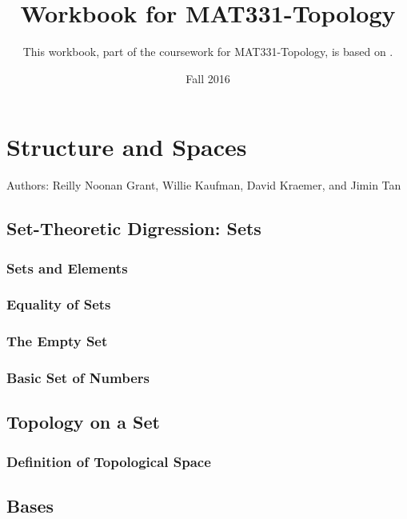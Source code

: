 \documentclass{book}
\title{Workbook for MAT331-Topology}
\date{Fall 2016}
\author{This workbook, part of the coursework for MAT331-Topology, is based on \cite{viro}.}
\begin{document}


\chapter{Structure and Spaces}
Authors: Reilly Noonan Grant, Willie Kaufman, David Kraemer, and Jimin Tan

\section{Set-Theoretic Digression: Sets}
\subsection{Sets and Elements}%
\subsection{Equality of Sets}%
\subsection{The Empty Set}%
\subsection{Basic Set of Numbers}%










\section{Topology on a Set}

\subsection{Definition of Topological Space}











%



\section{Bases}






\end{document}

